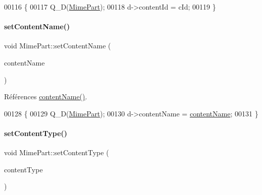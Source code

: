 \begin{DoxyCode}
00116 \{
00117     Q\_D(\hyperlink{class_simple_mail_1_1_mime_part}{MimePart});
00118     d->contentId = cId;
00119 \}
\end{DoxyCode}
\mbox{\label{class_simple_mail_1_1_mime_part_a83f6e6e295967d11923b64ed0bda437f}} 
\paragraph{\texorpdfstring{set\+Content\+Name()}{setContentName()}}
{\footnotesize\ttfamily void Mime\+Part\+::set\+Content\+Name (\begin{DoxyParamCaption}\item[{const Q\+Byte\+Array \&}]{content\+Name }\end{DoxyParamCaption})}



Références \hyperlink{class_simple_mail_1_1_mime_part_ad16adf3afc9873b4b0636cd3264e2f3e}{content\+Name()}.


\begin{DoxyCode}
00128 \{
00129     Q\_D(\hyperlink{class_simple_mail_1_1_mime_part}{MimePart});
00130     d->contentName = \hyperlink{class_simple_mail_1_1_mime_part_ad16adf3afc9873b4b0636cd3264e2f3e}{contentName};
00131 \}
\end{DoxyCode}
\mbox{\label{class_simple_mail_1_1_mime_part_a5acb0f9b764b723c4cfb1058490d2d8d}} 
\paragraph{\texorpdfstring{set\+Content\+Type()}{setContentType()}}
{\footnotesize\ttfamily void Mime\+Part\+::set\+Content\+Type (\begin{DoxyParamCaption}\item[{const Q\+Byte\+Array \&}]{content\+Type }\end{DoxyParamCaption})}




